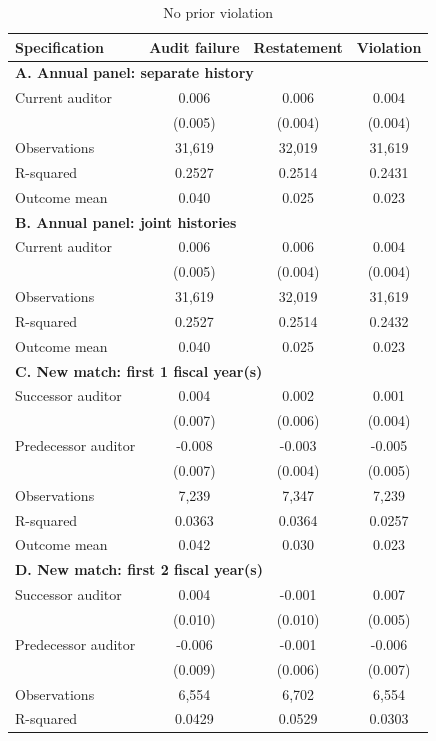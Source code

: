 \begin{table}[htbp]
\footnotesize
\centering
\caption{No prior violation}
\begin{threeparttable}
\begin{tabular}{p{}ccc}
\toprule
Specification & Audit failure & Restatement & Violation \\
\midrule
\multicolumn{4}{l}{\textbf{A. Annual panel: separate history}} \\
Current auditor & 0.006 & 0.006 & 0.004 \\
 & (0.005) & (0.004) & (0.004) \\
Observations & 31,619 & 32,019 & 31,619 \\
R-squared & 0.2527 & 0.2514 & 0.2431 \\
Outcome mean & 0.040 & 0.025 & 0.023 \\
\multicolumn{4}{l}{\textbf{B. Annual panel: joint histories}} \\
Current auditor & 0.006 & 0.006 & 0.004 \\
 & (0.005) & (0.004) & (0.004) \\
Observations & 31,619 & 32,019 & 31,619 \\
R-squared & 0.2527 & 0.2514 & 0.2432 \\
Outcome mean & 0.040 & 0.025 & 0.023 \\
\multicolumn{4}{l}{\textbf{C. New match: first 1 fiscal year(s)}} \\
Successor auditor & 0.004 & 0.002 & 0.001 \\
 & (0.007) & (0.006) & (0.004) \\
Predecessor auditor & -0.008 & -0.003 & -0.005 \\
 & (0.007) & (0.004) & (0.005) \\
Observations & 7,239 & 7,347 & 7,239 \\
R-squared & 0.0363 & 0.0364 & 0.0257 \\
Outcome mean & 0.042 & 0.030 & 0.023 \\
\multicolumn{4}{l}{\textbf{D. New match: first 2 fiscal year(s)}} \\
Successor auditor & 0.004 & -0.001 & 0.007 \\
 & (0.010) & (0.010) & (0.005) \\
Predecessor auditor & -0.006 & -0.001 & -0.006 \\
 & (0.009) & (0.006) & (0.007) \\
Observations & 6,554 & 6,702 & 6,554 \\
R-squared & 0.0429 & 0.0529 & 0.0303 \\

\end{tabular}
\end{threeparttable}
\end{table}
